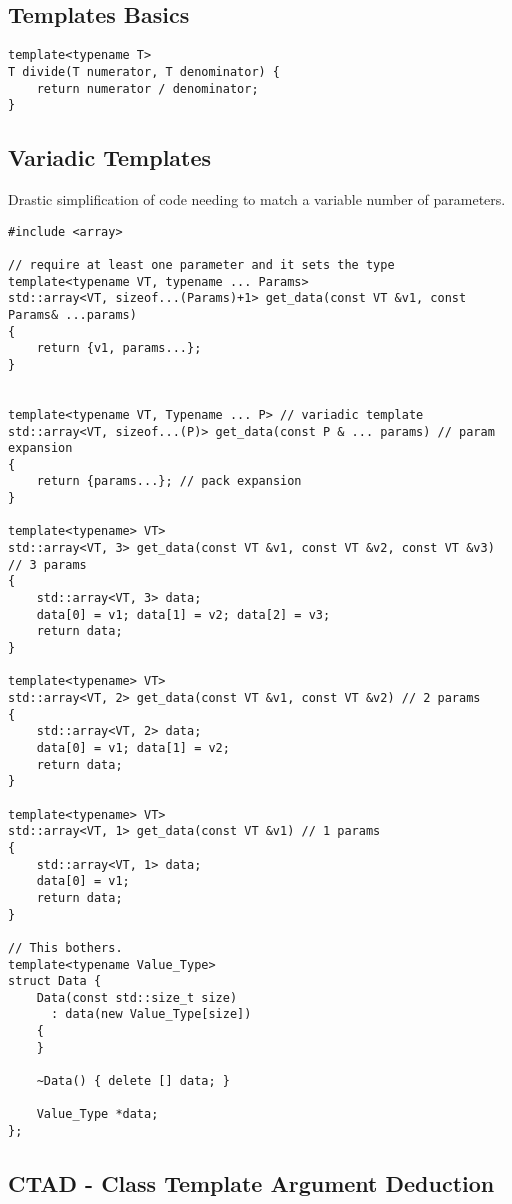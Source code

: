 \subsection{Templates Basics}

\begin{verbatim}
template<typename T>
T divide(T numerator, T denominator) {
    return numerator / denominator;
}
\end{verbatim}

\subsection{Variadic Templates}

Drastic simplification of code needing to match a variable number of parameters.

\begin{verbatim}
#include <array>

// require at least one parameter and it sets the type
template<typename VT, typename ... Params>
std::array<VT, sizeof...(Params)+1> get_data(const VT &v1, const Params& ...params)
{
    return {v1, params...};
}


template<typename VT, Typename ... P> // variadic template
std::array<VT, sizeof...(P)> get_data(const P & ... params) // param expansion
{
    return {params...}; // pack expansion
}

template<typename> VT>
std::array<VT, 3> get_data(const VT &v1, const VT &v2, const VT &v3) // 3 params
{
    std::array<VT, 3> data;
    data[0] = v1; data[1] = v2; data[2] = v3;
    return data;
}

template<typename> VT>
std::array<VT, 2> get_data(const VT &v1, const VT &v2) // 2 params
{
    std::array<VT, 2> data;
    data[0] = v1; data[1] = v2;
    return data;
}

template<typename> VT>
std::array<VT, 1> get_data(const VT &v1) // 1 params
{
    std::array<VT, 1> data;
    data[0] = v1;
    return data;
}

// This bothers.
template<typename Value_Type>
struct Data {
    Data(const std::size_t size)
      : data(new Value_Type[size])
    {
    }

    ~Data() { delete [] data; }

    Value_Type *data;
};
\end{verbatim}

\subsection{CTAD - Class Template Argument Deduction}

